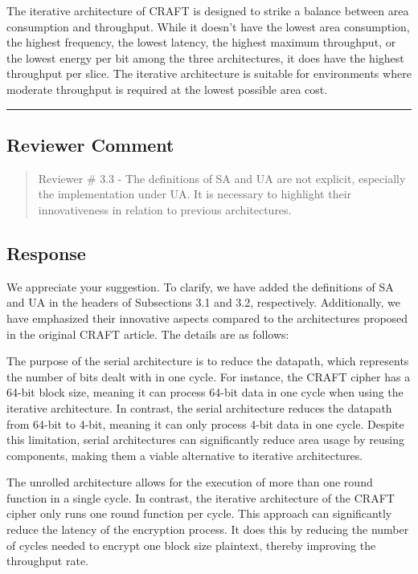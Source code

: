 The iterative architecture of CRAFT is designed to strike a balance between area consumption and throughput. While it doesn't have the lowest area consumption, the highest frequency, the lowest latency, the highest maximum throughput, or the lowest energy per bit among the three architectures, it does have the highest throughput per slice. The iterative architecture is suitable for environments where moderate throughput is required at the lowest possible area cost.
\color{black}

\noindent\rule{\linewidth}{2.0pt}

\subsection{Reviewer Comment}
\begin{mdframed}
	\begin{quote}
		Reviewer \# 3.3 - The definitions of SA and UA are not explicit, especially the implementation under UA. It is necessary to highlight their innovativeness in relation to previous architectures.
	\end{quote}
\end{mdframed}

\subsection{Response}

We appreciate your suggestion. To clarify, we have added the definitions of SA and UA in the headers of Subsections 3.1 and 3.2, respectively. Additionally, we have emphasized their innovative aspects compared to the architectures proposed in the original CRAFT article. The details are as follows:

\color{blue}
The purpose of the serial architecture is to reduce the datapath, which represents the number of bits dealt with in one cycle. For instance, the CRAFT cipher has a 64-bit block size, meaning it can process 64-bit data in one cycle when using the iterative architecture. In contrast, the serial architecture reduces the datapath from 64-bit to 4-bit, meaning it can only process 4-bit data in one cycle. Despite this limitation, serial architectures can significantly reduce area usage by reusing components, making them a viable alternative to iterative architectures.

The unrolled architecture allows for the execution of more than one round function in a single cycle. In contrast, the iterative architecture of the CRAFT cipher only runs one round function per cycle. This approach can significantly reduce the latency of the encryption process. It does this by reducing the number of cycles needed to encrypt one block size plaintext, thereby improving the throughput rate.
\color{black}

